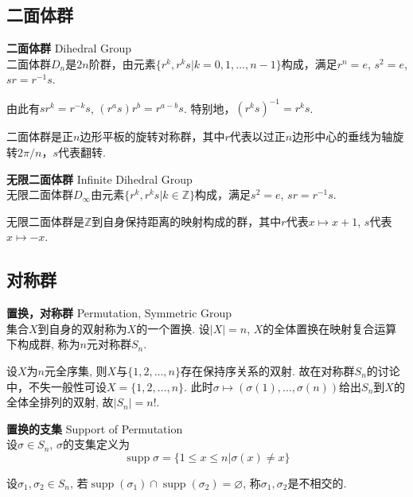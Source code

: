 \subsection{二面体群}

\begin{dfn}
\textbf{二面体群} Dihedral Group\\
二面体群$D_n$是$2n$阶群，由元素$\{r^k,r^ks\vert k=0,1,\dots,n-1\}$构成，满足$r^n=e$, $s^2=e$, $sr=r^{-1}s$.
\end{dfn}
由此有$sr^k=r^{-k}s$, $(r^as)r^b=r^{a-b}s$. 特别地，$(r^ks)^{-1}=r^ks$.

\par 二面体群是正$n$边形平板的旋转对称群，其中$r$代表以过正$n$边形中心的垂线为轴旋转$2\pi/n$，$s$代表翻转.

\begin{dfn}
\textbf{无限二面体群} Infinite Dihedral Group\\
无限二面体群$D_\infty$由元素$\{r^k,r^ks\vert k\in \mathbb{Z}\}$构成，满足$s^2=e$, $sr=r^{-1}s$.
\end{dfn}
\par 无限二面体群是$\mathbb{Z}$到自身保持距离的映射构成的群，其中$r$代表$x\mapsto x+1$, $s$代表$x\mapsto -x$.

\subsection{对称群}

\begin{dfn}\textbf{置换，对称群} Permutation, Symmetric Group\\
集合$X$到自身的双射称为$X$的一个置换. 设$|X|=n$, $X$的全体置换在映射复合运算下构成群, 称为$n$元对称群$S_n$. 
\end{dfn}

设$X$为$n$元全序集, 则$X$与$\{1,2,\dots,n\}$存在保持序关系的双射. 故在对称群$S_n$的讨论中，不失一般性可设$X=\{1,2,\dots,n\}$. 此时$\sigma \mapsto (\sigma(1), \dots, \sigma(n))$给出$S_n$到$X$的全体全排列的双射, 故$|S_n|=n!$.

\begin{dfn}\textbf{置换的支集} Support of Permutation\\
设$\sigma \in S_n$, $\sigma$的支集定义为
\begin{equation*}
    \operatorname{supp} \sigma = \{1\le x\le n \vert \sigma(x)\neq x\}
\end{equation*}
\end{dfn}
设$\sigma_1,\sigma_2\in S_n$, 若$\operatorname{supp}(\sigma_1) \cap \operatorname{supp}(\sigma_2) = \varnothing$, 称$\sigma_1,\sigma_2$是不相交的. 

